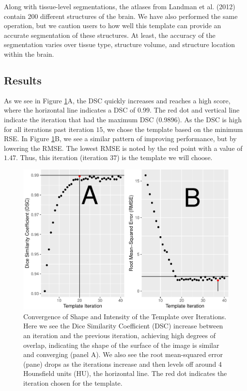 \documentclass[]{elsarticle} %
\makeatletter
\def\maxwidth{\ifdim\Gin@nat@width>\linewidth\linewidth
\else\Gin@nat@width\fi}
\let\Oldincludegraphics\includegraphics
\renewcommand{\includegraphics}[1]{\Oldincludegraphics[width=\maxwidth]{#1}}
\makeatother
\begin{document}
Along with tissue-level segmentations, the atlases from Landman et al. (2012) contain 200 different structures of the brain. We have also performed the same operation, but we caution users to how well this template can provide an accurate segmentation of these structures. At least, the accuracy of the segmentation varies over tissue type, structure volume, and structure location within the brain.

\hypertarget{results}{%
\subsection{Results}\label{results}}

As we see in Figure \ref{fig:performance}A, the DSC quickly increases and reaches a high score, where the horizontal line indicates a DSC of \(0.99\). The red dot and vertical line indicate the iteration that had the maximum DSC (0.9896). As the DSC is high for all iterations past iteration \(15\), we chose the template based on the minimum RSE. In Figure \ref{fig:performance}B, we see a similar pattern of improving performance, but by lowering the RMSE. The lowest RMSE is noted by the red point with a value of \(1.47\). Thus, this iteration (iteration \(37\)) is the template we will choose.

\begin{figure}
\centering
\includegraphics{index_files/figure-latex/performance-1.pdf}
\caption{\label{fig:performance}Convergence of Shape and Intensity of the Template over Iterations. Here we see the Dice Similarity Coefficient (DSC) increase between an iteration and the previous iteration, achieving high degrees of overlap, indicating the shape of the surface of the image is similar and converging (panel A). We also see the root mean-squared error (pane) drops as the iterations increase and then levels off around 4 Hounsfield units (HU), the horizontal line. The red dot indicates the iteration chosen for the template.}
\end{figure}
\end{document}
